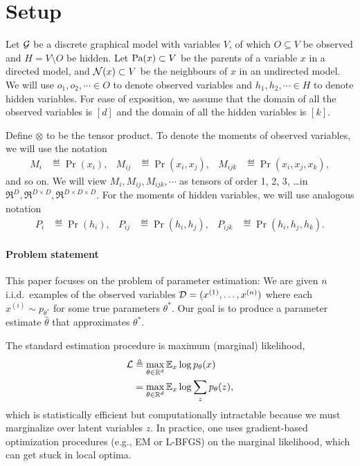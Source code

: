 \section{Setup}
\label{sec:setup}

Let $\mathcal{G}$ be a discrete graphical model with variables $V$, of which
  $O \subseteq V$ be observed and $H = V \setminus O$ be hidden.
Let $\textrm{Pa}(x) \subset V$ be the parents of a variable $x$ in a directed
  model, and $\mathcal{N}(x) \subset V$ be the neighbours of $x$ in an undirected
  model.
We will use $o_1, o_2, \cdots \in O$ to denote observed variables and
  $h_1, h_2, \cdots \in H$ to denote hidden variables.
For ease of exposition, we assume that the domain of all the observed
  variables is $[d]$ and the domain of all the hidden variables is
  $[k]$.

Define $\otimes$ to be the tensor product.
To denote the moments of observed variables, we will use the notation
\begin{align*}
  M_i &\eqdef \Pr(x_i), &
  M_{ij} &\eqdef \Pr(x_i, x_j), &
  M_{ijk} &\eqdef \Pr(x_i, x_j, x_k),
\end{align*}
and so on.
We will view $M_i, M_{ij}, M_{ijk}, \cdots$ as tensors of
  order 1, 2, 3, \ldots in $\Re^D, \Re^{D\times D}, \Re^{D \times
  D \times D}$.
For the moments of hidden variables, we will use analogous notation
\begin{align*}
  P_i &\eqdef \Pr(h_i), &
  P_{ij} &\eqdef \Pr(h_i, h_j), &
  P_{ijk} &\eqdef \Pr(h_i, h_j, h_k).
\end{align*}

\paragraph{Problem statement}

This paper focuses on the problem of parameter estimation:
We are given $n$ i.i.d.~examples of the observed variables $\mathcal{D} = (x^{(1)}, \dots, x^{(n)})$
where each $x^{(i)} \sim p_{\theta^*}$ for some true parameters $\theta^*$.
Our goal is to produce a parameter estimate $\hat\theta$ that approximates $\theta^*$.

The standard estimation procedure is maximum (marginal) likelihood,
  \begin{align*}
    \mathcal{L} &\triangleq \max_{\theta \in \mathbb{R}^d} \mathbb{E}_{x} \log p_\theta(x) \\
        &=      \max_{\theta \in \mathbb{R}^d} \mathbb{E}_{x} \log \sum_z p_\theta(z),
  \end{align*}
  which is statistically efficient but computationally intractable
  because we must marginalize over latent variables $z$.
In practice, one uses gradient-based optimization procedures (e.g., EM
  or L-BFGS) on the marginal likelihood, which can get stuck in local
  optima.


